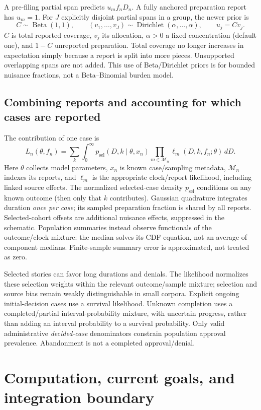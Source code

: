 \documentclass[10pt]{article}
\begin{document}
A pre-filing partial span predicts $u_m f_nD_n$. A fully anchored preparation
report has $u_m=1$. For $J$ explicitly disjoint partial spans in a group, the newer
prior is
\[
 C\sim\operatorname{Beta}(1,1),\qquad
 (v_1,\ldots,v_J)\sim\operatorname{Dirichlet}(\alpha,\ldots,\alpha),\qquad
 u_j=Cv_j.
\]
$C$ is total reported coverage, $v_j$ its allocation, $\alpha>0$ a fixed
concentration (default one), and $1-C$ unreported preparation. Total coverage no
longer increases in expectation simply because a report is split into more
pieces. Unsupported overlapping spans are not added. This use of Beta/Dirichlet
priors is for bounded nuisance fractions, not a Beta--Binomial burden model.

\subsection*{Combining reports and accounting for which cases are reported}
The contribution of one case is
\[
 L_n(\theta,f_n)=\sum_k\int_0^\infty
 p_{\mathrm{sel}}(D,k\mid\theta,x_n)
 \prod_{m\in\mathcal M_n}\ell_m(D,k,f_n;\theta)\,dD.
\]
Here $\theta$ collects model parameters, $x_n$ is known case/sampling metadata,
$\mathcal M_n$ indexes its reports, and $\ell_m$ is the appropriate clock/report
likelihood, including linked source effects. The normalized selected-case density
$p_{\mathrm{sel}}$ conditions on any known outcome (then only that $k$ contributes).
Gaussian quadrature integrates duration \emph{once per case}; its sampled
preparation fraction is shared by all reports. Selected-cohort offsets are
additional nuisance effects, suppressed in the schematic. Population summaries
instead observe functionals of the outcome/clock
mixture: the median solves its CDF equation, not an average of component medians.
Finite-sample summary error is approximated, not treated as zero.

Selected stories can favor long durations and denials. The likelihood normalizes
these selection weights within the relevant outcome/sample mixture; selection and
source bias remain weakly distinguishable in small corpora. Explicit ongoing
initial-decision cases use a survival likelihood. Unknown completion uses a
completed/partial interval-probability mixture, with uncertain progress, rather
than adding an interval probability to a survival probability. Only valid
administrative \emph{decided-case} denominators constrain population approval
prevalence. Abandonment is not a completed approval/denial.

\clearpage
\section{Computation, current goals, and integration boundary}
\end{document}
